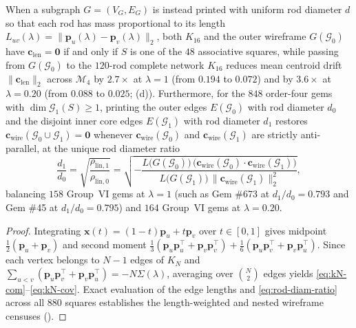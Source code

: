 \begin{theorem}
When a subgraph $G=(V_G,E_G)$ is instead printed with uniform rod diameter $d$ so that each rod has mass proportional to its length $L_{uv}(\lambda)=\|\mathbf p_u(\lambda)-\mathbf p_v(\lambda)\|_2$, both $K_{16}$ and the outer wireframe $G(\mathcal G_0)$ have $\mathbf c_{\mathrm{len}}=\mathbf 0$ if and only if $S$ is one of the $48$ associative squares, while passing from $G(\mathcal G_0)$ to the $120$-rod complete network $K_{16}$ reduces mean centroid drift $\|\mathbf c_{\mathrm{len}}\|_2$ across $\mathcal M_4$ by $2.7\times$ at $\lambda=1$ (from $0.194$ to $0.072$) and by $3.6\times$ at $\lambda=0.20$ (from $0.088$ to $0.025$; (d)). Furthermore, for the $848$ order-four gems with $\dim\mathcal G_1(S)\ge1$, printing the outer edges $E(\mathcal G_0)$ with rod diameter $d_0$ and the disjoint inner core edges $E(\mathcal G_1)$ with rod diameter $d_1$ restores $\mathbf c_{\mathrm{wire}}(\mathcal G_0\cup\mathcal G_1)=\mathbf 0$ whenever $\mathbf c_{\mathrm{wire}}(\mathcal G_0)$ and $\mathbf c_{\mathrm{wire}}(\mathcal G_1)$ are strictly anti-parallel, at the unique rod diameter ratio
\begin{equation}
\label{eq:rod-diam-ratio}
\frac{d_1}{d_0} = \sqrt{\frac{\rho_{\mathrm{lin},1}}{\rho_{\mathrm{lin},0}}}
= \sqrt{-\frac{L\bigl(G(\mathcal G_0)\bigr)\,\bigl(\mathbf c_{\mathrm{wire}}(\mathcal G_0)\cdot\mathbf c_{\mathrm{wire}}(\mathcal G_1)\bigr)}{L\bigl(G(\mathcal G_1)\bigr)\,\|\mathbf c_{\mathrm{wire}}(\mathcal G_1)\|_2^2}},
\end{equation}
balancing $158$ Group~VI gems at $\lambda=1$ (such as Gem \#673 at $d_1/d_0=0.793$ and Gem \#45 at $d_1/d_0=0.795$) and $164$ Group~VI gems at $\lambda=0.20$.
\end{theorem}

\begin{proof}
Integrating $\mathbf x(t)=(1-t)\mathbf p_u+t\mathbf p_v$ over $t\in[0,1]$ gives midpoint $\frac12(\mathbf p_u+\mathbf p_v)$ and second moment $\frac13(\mathbf p_u\mathbf p_u^{\top}+\mathbf p_v\mathbf p_v^{\top})+\frac16(\mathbf p_u\mathbf p_v^{\top}+\mathbf p_v\mathbf p_u^{\top})$. Since each vertex belongs to $N-1$ edges of $K_N$ and $\sum_{u<v}(\mathbf p_u\mathbf p_v^{\top}+\mathbf p_v\mathbf p_u^{\top})=-N\Sigma(\lambda)$, averaging over $\binom{N}{2}$ edges yields \eqref{eq:kN-com}--\eqref{eq:kN-cov}. Exact evaluation of the edge lengths and \eqref{eq:rod-diam-ratio} across all $880$ squares establishes the length-weighted and nested wireframe censuses ().
\end{proof}

